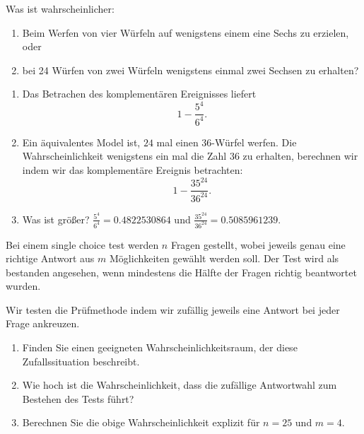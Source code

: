 Was ist wahrscheinlicher:
\begin{enumerate}
    \item Beim Werfen von vier Würfeln auf wenigstens einem eine Sechs zu
        erzielen, oder
    \item bei 24 Würfen von zwei Würfeln wenigstens einmal zwei Sechsen zu
        erhalten?
\end{enumerate}

\solution
\begin{enumerate}
    \item Das Betrachen des komplementären Ereignisses liefert
        \begin{equation*}
            1 - \frac{5^4}{6^4}.
        \end{equation*}
    \item Ein äquivalentes Model ist, $24$ mal einen $36$-Würfel werfen. Die
        Wahrscheinlichkeit wenigstens ein mal die Zahl $36$ zu erhalten,
        berechnen wir indem wir das komplementäre Ereignis betrachten:
        \begin{equation*} 
            1 - \frac{35^{24}}{36^{24}}.  
        \end{equation*}
    \item Was ist größer? $\frac{5^4}{6^4} = 0.4822530864$ und
        $\frac{35^{24}}{36^{24}} = 0.5085961239$.

\end{enumerate}




 Bei einem single choice test
werden $n$ Fragen gestellt, wobei jeweils genau eine richtige Antwort aus $m$
Möglichkeiten gewählt werden soll. Der Test wird als bestanden angesehen, wenn
mindestens die Hälfte der Fragen richtig beantwortet wurden.

Wir testen die Prüfmethode indem wir zufällig jeweils eine Antwort bei jeder Frage
ankreuzen. 
\begin{enumerate}
    \item Finden Sie einen geeigneten Wahrscheinlichkeitsraum, der diese
        Zufallssituation \linebreak beschreibt.
    \item Wie hoch ist die Wahrscheinlichkeit, dass die zufällige Antwortwahl zum 
        Bestehen des Tests führt?
    \item Berechnen Sie die obige Wahrscheinlichkeit explizit für $n=25$ und $m=4$.
\end{enumerate}

